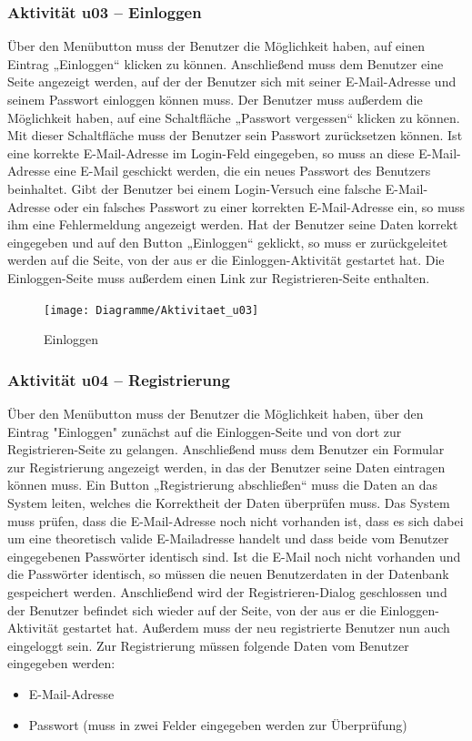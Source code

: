 \documentclass[a4paper,12pt,oneside]{scrartcl}
\begin{document}
\subsubsection{Aktivität u03 – Einloggen}
Über den Menübutton muss der Benutzer die Möglichkeit haben, auf einen Eintrag „Einloggen“ klicken zu können.
Anschließend muss dem Benutzer eine Seite angezeigt werden, auf der der Benutzer sich mit seiner E-Mail-Adresse und seinem Passwort einloggen können muss.
Der Benutzer muss außerdem die Möglichkeit haben, auf eine Schaltfläche „Passwort vergessen“ klicken zu können. Mit dieser Schaltfläche muss der Benutzer sein Passwort zurücksetzen können.
Ist eine korrekte E-Mail-Adresse im Login-Feld eingegeben, so muss an diese E-Mail-Adresse eine E-Mail geschickt werden, die ein neues Passwort des Benutzers beinhaltet.
Gibt der Benutzer bei einem Login-Versuch eine falsche E-Mail-Adresse oder ein falsches Passwort zu einer korrekten E-Mail-Adresse ein, so muss ihm eine Fehlermeldung angezeigt werden.
Hat der Benutzer seine Daten korrekt eingegeben und auf den Button „Einloggen“ geklickt, so muss er zurückgeleitet werden auf die Seite, von der aus er die Einloggen-Aktivität gestartet hat.
Die Einloggen-Seite muss außerdem einen Link zur Registrieren-Seite enthalten.

\begin{figure}[!htbp]
\centering
\noindent\texttt{[image: Diagramme/Aktivitaet\_u03]}
\caption{Einloggen}
\end{figure}
\FloatBarrier


\subsubsection{Aktivität u04 – Registrierung}
Über den Menübutton muss der Benutzer die Möglichkeit haben, über den Eintrag "Einloggen" zunächst auf die Einloggen-Seite und von dort zur Registrieren-Seite zu gelangen.
Anschließend muss dem Benutzer ein Formular zur Registrierung angezeigt werden, in das der Benutzer seine Daten eintragen können muss.
Ein Button „Registrierung abschließen“ muss die Daten an das System leiten, welches die Korrektheit der Daten überprüfen muss.
Das System muss prüfen, dass die E-Mail-Adresse noch nicht vorhanden ist, dass es sich dabei um eine theoretisch valide E-Mailadresse handelt und dass beide vom Benutzer eingegebenen Passwörter identisch sind.
Ist die E-Mail noch nicht vorhanden und die Passwörter identisch, so müssen die neuen Benutzerdaten in der Datenbank gespeichert werden. Anschließend wird der Registrieren-Dialog geschlossen und der Benutzer befindet sich wieder auf der Seite, von der aus er die Einloggen-Aktivität gestartet hat.
Außerdem muss der neu registrierte Benutzer nun auch eingeloggt sein.
Zur Registrierung müssen folgende Daten vom Benutzer eingegeben werden:
\begin{itemize}
	\item E-Mail-Adresse
	\item Passwort (muss in zwei Felder eingegeben werden zur Überprüfung)
\end{itemize}
\end{document}
